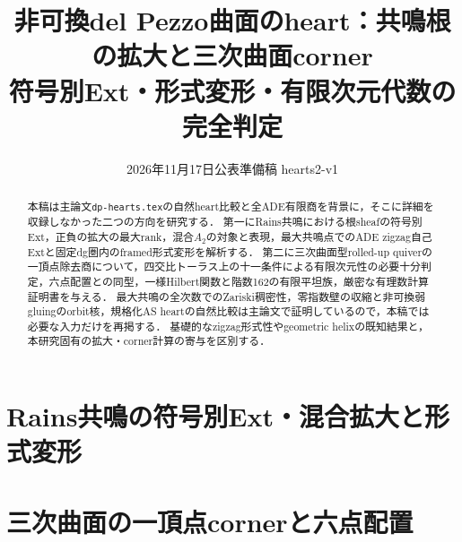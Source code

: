 \documentclass[11pt,a4paper]{ltjsarticle}
\title{非可換del Pezzo曲面のheart：共鳴根の拡大と三次曲面corner\\
\large 符号別Ext・形式変形・有限次元代数の完全判定}
\author{}
\date{2026年11月17日\qquad 公表準備稿 hearts2-v1}
\theoremstyle{definition}\newtheorem{remark}[theorem]{注意}
\begin{document}
\maketitle
\begin{abstract}
本稿は主論文\texttt{dp-hearts.tex}の自然heart比較と全ADE有限商を背景に，そこに詳細を収録しなかった二つの方向を研究する．
第一にRains共鳴における根sheafの符号別Ext，正負の拡大の最大rank，混合$A_2$の対象と表現，最大共鳴点でのADE zigzag自己Extと固定dg圏内のframed形式変形を解析する．
第二に三次曲面型rolled-up quiverの一頂点除去商について，四交比トーラス上の十一条件による有限次元性の必要十分判定，六点配置との同型，一様Hilbert関数と階数162の有限平坦族，厳密な有理数計算証明書を与える．
最大共鳴の全次数でのZariski稠密性，零指数壁の収縮と非可換弱gluingのorbit核，規格化AS heartの自然比較は主論文で証明しているので，本稿では必要な入力だけを再掲する．
基礎的なzigzag形式性やgeometric helixの既知結果と，本研究固有の拡大・corner計算の寄与を区別する．
\end{abstract}
\tableofcontents

\part{Rains共鳴の符号別Ext・混合拡大と形式変形}


\part{三次曲面の一頂点cornerと六点配置}

\end{document}
